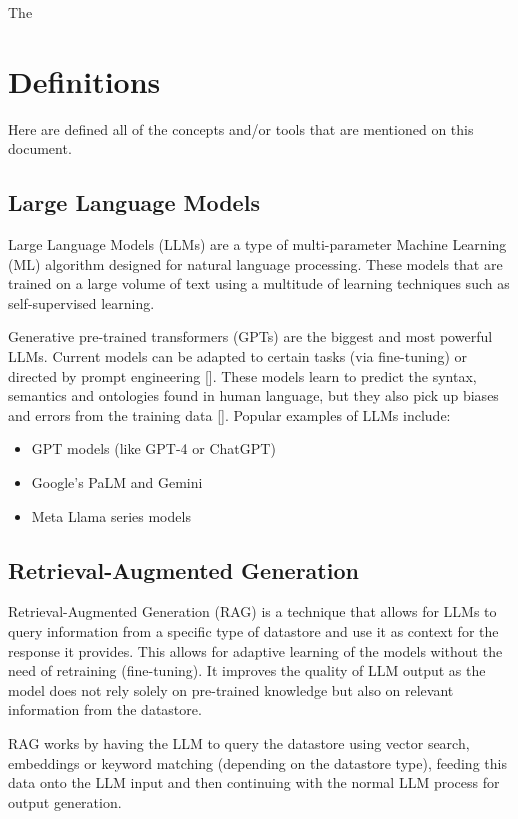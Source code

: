 The

\section{Definitions}
Here are defined all of the concepts and/or tools that are mentioned on this document.

\subsection{Large Language Models}
Large Language Models (LLMs) are a type of multi-parameter Machine Learning (ML) algorithm designed
for natural language processing. These models that are trained on a large volume of text using a
multitude of learning techniques such as self-supervised learning.

Generative pre-trained transformers (GPTs) are the biggest and most powerful LLMs. Current models
can be adapted to certain tasks (via fine-tuning) or directed by prompt engineering
	[\cite{brown2020languagemodelsfewshotlearners}]. These models learn to predict the syntax,
semantics and ontologies found in human language, but they also pick up biases and errors from the
training data [\cite{10.1162/daed_a_01905}]. Popular examples of LLMs include:
\begin{itemize}
	\item GPT models (like GPT-4 or ChatGPT)
	\item Google's PaLM and Gemini
	\item Meta Llama series models
\end{itemize}

\subsection{Retrieval-Augmented Generation}
Retrieval-Augmented Generation (RAG) is a technique that allows for LLMs to query information from
a specific type of datastore and use it as context for the response it provides. This allows for
adaptive learning of the models without the need of retraining (fine-tuning). It improves the
quality of LLM output as the model does not rely solely on pre-trained knowledge but also on
relevant information from the datastore.

RAG works by having the LLM to query the datastore using vector search, embeddings or keyword
matching (depending on the datastore type), feeding this data onto the LLM input and then
continuing with the normal LLM process for output generation.

